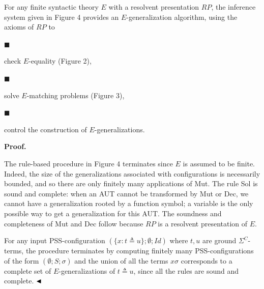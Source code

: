 \documentclass[10pt,a4paper]{amsart}
\begin{document}
For any finite syntactic theory $E$ with a resolvent presentation $RP$, the inference system given in Figure 4 provides an $E$-generalization algorithm, using the axioms of $RP$ to\par
  
\par\noindent  $\blacksquare$ 
 
check $E$-equality (Figure 2),\par
 
 
 
\par\noindent  $\blacksquare$ 
 
solve $E$-matching problems (Figure 3),\par
 
 
 
\par\noindent  $\blacksquare$ 
 
control the construction of $E$-generalizations.\par
 
 
  
 
 
 
\par\medskip\noindent\textbf{Proof.}\par
 
 
The rule-based procedure in Figure 4 terminates since $E$ is assumed to be finite. Indeed, the size of the generalizations associated with configurations is necessarily bounded, and so there are only finitely many applications of Mut. The rule Sol is sound and complete: when an AUT cannot be transformed by Mut or Dec, we cannot have a generalization rooted by a function symbol; a variable is the only possible way to get a generalization for this AUT. The soundness and completeness of Mut and Dec follow because $RP$ is a resolvent presentation of $E$.\par
 
 
 
For any input PSS-configuration $(\{x:t\triangleq u\};\emptyset;\mathit{Id})$ where $t,u$ are ground ${\Sigma}^{C}$-terms, the procedure terminates by computing finitely many PSS-configurations of the form $(\emptyset;S;\sigma)$ and the union of all the terms $x\sigma$ corresponds to a complete set of $E$-generalizations of $t\triangleq u$, since all the rules are sound and complete. $\hfill\blacktriangleleft$\par
 
\end{document}
